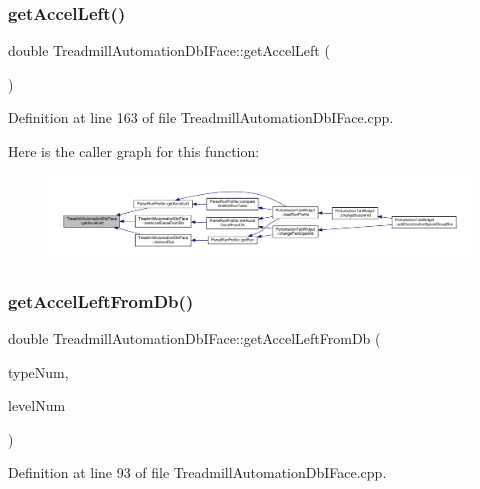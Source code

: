 \subsubsection{\texorpdfstring{get\+Accel\+Left()}{getAccelLeft()}}
{\footnotesize\ttfamily double Treadmill\+Automation\+Db\+I\+Face\+::get\+Accel\+Left (\begin{DoxyParamCaption}{ }\end{DoxyParamCaption})}



Definition at line 163 of file Treadmill\+Automation\+Db\+I\+Face.\+cpp.

Here is the caller graph for this function\+:
\nopagebreak
\begin{figure}[H]
\begin{center}
\leavevmode
\includegraphics[width=350pt]{class_treadmill_automation_db_i_face_acee195f59106d1c96ca0cefe00e0e3f7_icgraph}
\end{center}
\end{figure}
\mbox{\label{class_treadmill_automation_db_i_face_a9d028cc3d56ffa0f9a08bcbb1a7a68b7}} 
\subsubsection{\texorpdfstring{get\+Accel\+Left\+From\+Db()}{getAccelLeftFromDb()}}
{\footnotesize\ttfamily double Treadmill\+Automation\+Db\+I\+Face\+::get\+Accel\+Left\+From\+Db (\begin{DoxyParamCaption}\item[{Q\+String}]{type\+Num,  }\item[{Q\+String}]{level\+Num }\end{DoxyParamCaption})}



Definition at line 93 of file Treadmill\+Automation\+Db\+I\+Face.\+cpp.

